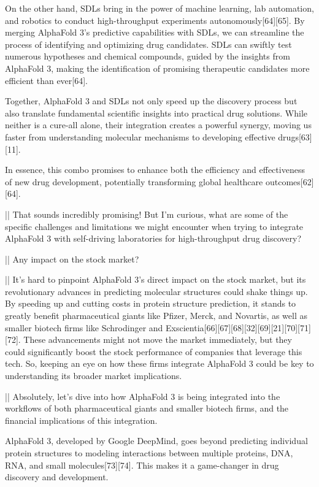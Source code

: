 \documentclass[11pt]{article}
\begin{document}
\begin{showcase}[title=Topic: AlphaFold 3]
On the other hand, SDLs bring in the power of machine learning, lab automation, and robotics to conduct high-throughput experiments autonomously[64][65]. By merging AlphaFold 3's predictive capabilities with SDLs, we can streamline the process of identifying and optimizing drug candidates. SDLs can swiftly test numerous hypotheses and chemical compounds, guided by the insights from AlphaFold 3, making the identification of promising therapeutic candidates more efficient than ever[64].

Together, AlphaFold 3 and SDLs not only speed up the discovery process but also translate fundamental scientific insights into practical drug solutions. While neither is a cure-all alone, their integration creates a powerful synergy, moving us faster from understanding molecular mechanisms to developing effective drugs[63][11].

In essence, this combo promises to enhance both the efficiency and effectiveness of new drug development, potentially transforming global healthcare outcomes[62][64].

||
That sounds incredibly promising! But I'm curious, what are some of the specific challenges and limitations we might encounter when trying to integrate AlphaFold 3 with self-driving laboratories for high-throughput drug discovery?

||
Any impact on the stock market?

||
It's hard to pinpoint AlphaFold 3's direct impact on the stock market, but its revolutionary advances in predicting molecular structures could shake things up. By speeding up and cutting costs in protein structure prediction, it stands to greatly benefit pharmaceutical giants like Pfizer, Merck, and Novartis, as well as smaller biotech firms like Schrodinger and Exscientia[66][67][68][32][69][21][70][71][72]. These advancements might not move the market immediately, but they could significantly boost the stock performance of companies that leverage this tech. So, keeping an eye on how these firms integrate AlphaFold 3 could be key to understanding its broader market implications.

||
Absolutely, let's dive into how AlphaFold 3 is being integrated into the workflows of both pharmaceutical giants and smaller biotech firms, and the financial implications of this integration.

AlphaFold 3, developed by Google DeepMind, goes beyond predicting individual protein structures to modeling interactions between multiple proteins, DNA, RNA, and small molecules[73][74]. This makes it a game-changer in drug discovery and development.


\end{showcase}
\end{document}
